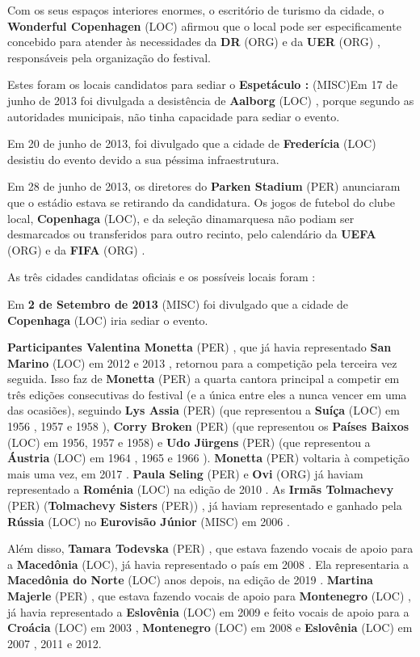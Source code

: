 \documentclass[12pt,a4paper]{article}
\begin{document}
Com os seus espaços interiores enormes, o escritório de turismo da cidade, o \textbf{Wonderful Copenhagen} (LOC) afirmou que o local pode ser especificamente concebido para atender às necessidades da \textbf{DR} (ORG) e da \textbf{UER} (ORG) , responsáveis pela organização do festival.

Estes foram os locais candidatos para sediar o \textbf{Espetáculo :} (MISC)Em 17 de junho de 2013 foi divulgada a desistência de \textbf{Aalborg} (LOC) , porque segundo as autoridades municipais, não tinha capacidade para sediar o evento.

Em 20 de junho de 2013, foi divulgado que a cidade de \textbf{Frederícia} (LOC) desistiu do evento devido a sua péssima infraestrutura.

Em 28 de junho de 2013, os diretores do \textbf{Parken Stadium} (PER) anunciaram que o estádio estava se retirando da candidatura. Os jogos de futebol do clube local, \textbf{Copenhaga} (LOC), e da seleção dinamarquesa não podiam ser desmarcados ou transferidos para outro recinto, pelo calendário da \textbf{UEFA} (ORG) e da \textbf{FIFA} (ORG) .

As três cidades candidatas oficiais e os possíveis locais foram :

Em \textbf{2 de Setembro de 2013} (MISC) foi divulgado que a cidade de \textbf{Copenhaga} (LOC) iria sediar o evento.



\textbf{Participantes Valentina Monetta} (PER) , que já havia representado \textbf{San Marino} (LOC) em 2012 e 2013 , retornou para a competição pela terceira vez seguida. Isso faz de \textbf{Monetta} (PER) a quarta cantora principal a competir em três edições consecutivas do festival (e a única entre eles a nunca vencer em uma das ocasiões), seguindo \textbf{Lys Assia} (PER) (que representou a \textbf{Suíça} (LOC) em 1956 , 1957 e 1958 ), \textbf{Corry Broken} (PER) (que representou os \textbf{Países Baixos} (LOC) em 1956, 1957 e 1958) e \textbf{Udo Jürgens} (PER) (que representou a \textbf{Áustria} (LOC) em 1964 , 1965 e 1966 ). \textbf{Monetta} (PER) voltaria à competição mais uma vez, em 2017 . \textbf{Paula Seling} (PER) e \textbf{Ovi} (ORG) já haviam representado a \textbf{Roménia} (LOC) na edição de 2010 . As \textbf{Irmãs Tolmachevy} (PER) (\textbf{Tolmachevy Sisters} (PER)) , já haviam representado e ganhado pela \textbf{Rússia} (LOC) no \textbf{Eurovisão Júnior} (MISC) em 2006 .

Além disso, \textbf{Tamara Todevska} (PER) , que estava fazendo vocais de apoio para a \textbf{Macedônia} (LOC), já havia representado o país em 2008 . Ela representaria a \textbf{Macedônia do Norte} (LOC) anos depois, na edição de 2019 . \textbf{Martina Majerle} (PER) , que estava fazendo vocais de apoio para \textbf{Montenegro} (LOC) , já havia representado a \textbf{Eslovênia} (LOC) em 2009 e feito vocais de apoio para a \textbf{Croácia} (LOC) em 2003 , \textbf{Montenegro} (LOC) em 2008 e \textbf{Eslovênia} (LOC) em 2007 , 2011 e 2012.
\end{document}

